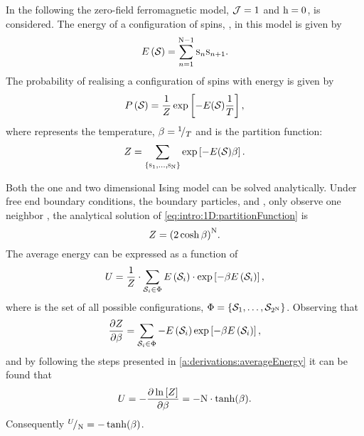 	In the following the zero-field ferromagnetic model, \ie \mbox{$\mathcal{J} = 1$} and \mbox{$\mathrm{h} = 0$},  is considered. The energy \energy of a configuration of spins, \configuration{}, in this model is given by 
	\begin{equation*}
		E\left(\mathcal{S}_{}\right) = \sum_{n = 1}^{\mathrm{N} - 1}\textsc{s}_{n}\textsc{s}_{n+1}.
	\end{equation*}
	The probability of realising a configuration of spins \configuration{} with energy \energy is given by
	\begin{equation}
		\label{eq:intro:1D:configurationProbability}
		P\left(\mathcal{S}_{}\right) = 
		\frac{1}{Z} \exp\left[-{E(\mathcal{S}_{})}\frac{1}{T}\right],
	\end{equation}
	where \temperature represents the temperature, $\beta = {}^{1}\!/_{T}$ and \partitionfunction is the partition function:
	\begin{equation}
		\label{eq:intro:1D:partitionFunction}
		Z = \sum_{\left\{\textsc{s}_{1}, \dotsc, \textsc{s}_{\mathrm{N}} \right\}} \exp\left[- {E(\mathcal{S}_{})} \beta \right].
	\end{equation}

	Both the one and two dimensional Ising model can be solved analytically. Under free end boundary conditions, \ie the boundary particles,  and \spin{\numberOfSpins}, only observe one neighbor \cite{landau2014guide}, the analytical solution of \cref{eq:intro:1D:partitionFunction} is
	\begin{equation}
		\label{eq:introduced1D:partitionFunctionAnalyticalSolution}
		Z = {(2 \cosh \beta)}^\mathrm{N}.
	\end{equation}
	The average energy can be expressed as a function of \partitionfunction \cite{Murray20011Handout}
	\begin{equation*}
		U = \frac{1}{Z} \cdot \sum_{\mathcal{S}_{i} \in \Phi} E\left(\mathcal{S}_{i}\right) \cdot \exp\left[-\beta E\left(\mathcal{S}_{i}\right) \right],
	\end{equation*} 
	where \allPossibleConfigurations is the set of all possible configurations, \ie $\Phi = \left\{\mathcal{S}_{1}, \dotsc, \mathcal{S}_{2^\mathrm{N}}\right\}$. Observing that
	\begin{equation*}
		\frac{\partial Z}{\partial \beta} = \sum_{\mathcal{S}_{i} \in \Phi} - E\left(\mathcal{S}_{i}\right) \exp\left[-\beta E\left(\mathcal{S}_{i}\right) \right],
	\end{equation*}
	and by following the steps presented in \cref{a:derivations:averageEnergy} it can be found that
	\begin{equation*}
		U = - \frac{\partial \ln \left[ Z \right]}{\partial \beta} = - \mathrm{N} \cdot \tanh (\beta).
	\end{equation*}
	Consequently ${}^{U}\!/_{\mathrm{N}} = - \tanh (\beta)$.

